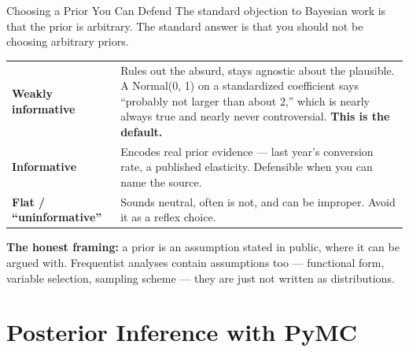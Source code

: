 \documentclass[aspectratio=169, 11pt]{beamer}
\begin{document}
\begin{frame}{Choosing a Prior You Can Defend}
  The standard objection to Bayesian work is that the prior is arbitrary. The standard answer is
  that you should not be choosing arbitrary priors.

  \begin{center}
    {\small
    \begin{tabular}{p{3.3cm}p{9.0cm}}
      \toprule
      \textbf{Weakly informative} & Rules out the absurd, stays agnostic about the plausible. A
      Normal(0, 1) on a standardized coefficient says ``probably not larger than about 2,''
      which is nearly always true and nearly never controversial. \textbf{This is the default.} \\[3pt]
      \textbf{Informative} & Encodes real prior evidence --- last year's conversion rate, a
      published elasticity. Defensible when you can name the source. \\[3pt]
      \textbf{Flat / ``uninformative''} & Sounds neutral, often is not, and can be improper.
      Avoid it as a reflex choice. \\
      \bottomrule
    \end{tabular}
    }
  \end{center}

  \textbf{The honest framing:} a prior is an assumption stated in public, where it can be argued
  with. Frequentist analyses contain assumptions too --- functional form, variable selection,
  sampling scheme --- they are just not written as distributions.
\end{frame}

\section{Posterior Inference with PyMC}

\end{document}
